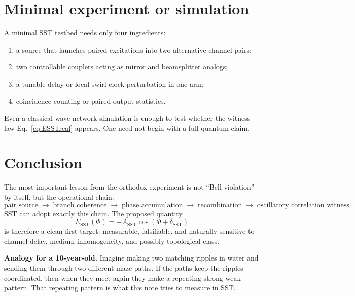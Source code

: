 \documentclass[11pt]{article}
\begin{document}
    \section{Minimal experiment or simulation}
        
        A minimal SST testbed needs only four ingredients:
        \begin{enumerate}[label=(\roman*)]
\item a source that launches paired excitations into two alternative channel pairs;
\item two controllable couplers acting as mirror and beamsplitter analogs;
\item a tunable delay or local swirl-clock perturbation in one arm;
\item coincidence-counting or paired-output statistics.
        \end{enumerate}
        
        Even a classical wave-network simulation is enough to test whether the witness law Eq.~\eqref{eq:ESSTreal} appears. One need not begin with a full quantum claim.
    
    \section{Conclusion}
        
        The most important lesson from the orthodox experiment is not “Bell violation” by itself, but the operational chain:
        \[
            \text{pair source}
            \;\to\;
            \text{branch coherence}
            \;\to\;
            \text{phase accumulation}
            \;\to\;
            \text{recombination}
            \;\to\;
            \text{oscillatory correlation witness}.
        \]
        SST can adopt exactly this chain. The proposed quantity
        \[
            E_{\mathrm{SST}}(\Phi)
            =
            -A_{\mathrm{SST}}\cos(\Phi+\delta_{\mathrm{SST}})
        \]
        is therefore a clean first target: measurable, falsifiable, and naturally sensitive to channel delay, medium inhomogeneity, and possibly topological class.
        
        \bigskip
        \noindent\textbf{Analogy for a 10-year-old.} Imagine making two matching ripples in water and sending them through two different maze paths. If the paths keep the ripples coordinated, then when they meet again they make a repeating strong-weak pattern. That repeating pattern is what this note tries to measure in SST.
        
\end{document}
